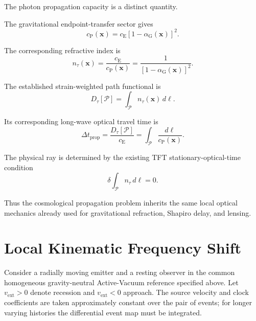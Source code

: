The photon propagation capacity is a distinct quantity.

The gravitational endpoint-transfer sector gives
\begin{equation}
    \boxed{
    c_{\mathrm P}(\mathbf{x})
    =
    c_{\mathrm E}
    [1-\alpha_{\mathrm G}(\mathbf{x})]^2.
    }
    \label{eq:AR_cP}
\end{equation}

The corresponding refractive index is
\begin{equation}
    \boxed{
    n_\tau(\mathbf{x})
    =
    \frac{c_{\mathrm E}}{c_{\mathrm P}(\mathbf{x})}
    =
    \frac{1}{
        [1-\alpha_{\mathrm G}(\mathbf{x})]^2
    }.
    }
    \label{eq:AR_ntau}
\end{equation}

The established strain-weighted path functional is
\begin{equation}
    \boxed{
    D_\tau[\mathcal P]
    =
    \int_{\mathcal P}
    n_\tau(\mathbf{x})\,d\ell.
    }
    \label{eq:AR_Dtau}
\end{equation}

Its corresponding long-wave optical travel time is
\begin{equation}
    \boxed{
    \Delta t_{\mathrm{prop}}
    =
    \frac{D_\tau[\mathcal P]}{c_{\mathrm E}}
    =
    \int_{\mathcal P}
    \frac{d\ell}{c_{\mathrm P}(\mathbf{x})}.
    }
    \label{eq:AR_tprop}
\end{equation}

The physical ray is determined by the existing TFT stationary-optical-time
condition
\begin{equation}
    \delta
    \int_{\mathcal P}
    n_\tau\,d\ell
    =
    0.
    \label{eq:AR_ray}
\end{equation}

Thus the cosmological propagation problem inherits the same local optical
mechanics already used for gravitational refraction, Shapiro delay, and
lensing.


\section{Local Kinematic Frequency Shift}

Consider a radially moving emitter and a resting observer in the common
homogeneous gravity-neutral Active-Vacuum reference specified above. Let
\(v_{\mathrm{ext}}>0\) denote recession and \(v_{\mathrm{ext}}<0\) approach.
The source velocity and clock coefficients are taken approximately constant
over the pair of events; for longer varying histories the differential
event map must be integrated.

